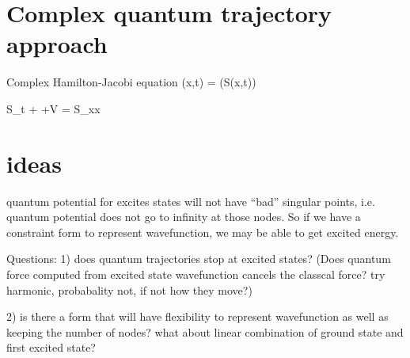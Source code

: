 \section{Complex quantum trajectory approach} 
Complex Hamilton-Jacobi equation 
\be \psi(x,t) = \exp \left(\frac{\im}{\hbar}S(x,t)\right) \ee 

\be S_t + +V = S_{xx} \ee 

\section{ideas}

quantum potential for excites states will not have ``bad'' singular points, i.e. quantum potential does not go to infinity at those nodes.
So if we have a constraint form to represent wavefunction, we may be able to get excited energy.

Questions: 
1) does quantum trajectories stop at excited states? 
(Does quantum force computed from excited state wavefunction cancels the classcal force? try harmonic, probabality not, if not how they move?)

2) is there a form that will have flexibility to represent wavefunction as well as keeping the number of nodes? what about 
linear combination of ground state and first excited state? 





     
 


